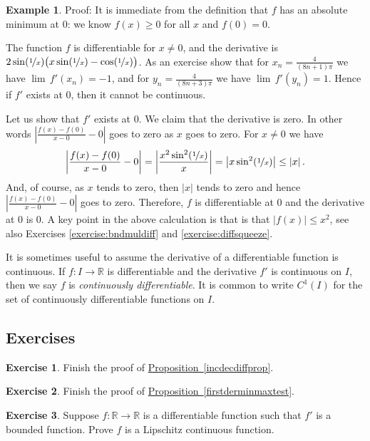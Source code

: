 \documentclass[12pt]{book}
\newcommand{\abs}[1]{\left\lvert {#1} \right\rvert}
\newcommand{\R}{{\mathbb{R}}}
\newcommand{\myindex}[1]{#1\index{#1}}
\theoremstyle{plain}
\theoremstyle{remark}
\theoremstyle{definition}
\theoremstyle{exercise}
\newtheorem{exercise}{Exercise}[section]
\theoremstyle{example}
\newtheorem{example}[thm]{Example}
\newcommand{\propref}[1]{\hyperref[#1]{Proposition~\ref*{#1}}}
\begin{document}
\begin{example}
Proof: It is immediate from the definition that $f$ has an absolute
minimum at 0: we know $f(x) \geq 0$ for all $x$ and $f(0) = 0$.

The function $f$ is differentiable for $x\not=0$,
and
the derivative 
is $2 \sin (\nicefrac{1}{x}) \bigl( x \sin (\nicefrac{1}{x}) -
\cos(\nicefrac{1}{x}) \bigr)$.
As an exercise show that for $x_n = \frac{4}{(8n+1)\pi}$
we have
$\lim\, f'(x_n) = -1$, and for
$y_n = \frac{4}{(8n+3)\pi}$  we have
$\lim\, f'(y_n) = 1$.  Hence if $f'$ exists at $0$,
then it cannot be continuous.

Let us show that $f'$ exists at 0.  We claim that the derivative is zero.
In other words $\abs{\frac{f(x)-f(0)}{x-0} - 0}$ goes to zero
as $x$ goes to zero.  For $x \not= 0$ we have
\begin{equation*}
\abs{\frac{f(x)-f(0)}{x-0} - 0}
=
\abs{\frac{x^2 \sin^2(\nicefrac{1}{x})}{x}}
=
\abs{x \sin^2(\nicefrac{1}{x})}
\leq
\abs{x} .
\end{equation*}
And, of course, as $x$ tends to zero, then $\abs{x}$ tends to zero and hence
$\abs{\frac{f(x)-f(0)}{x-0} - 0}$ goes to zero.  Therefore, $f$
is differentiable at 0 and the derivative at 0 is 0.
A key point in the above calculation is that 
is that $\abs{f(x)} \leq x^2$,
see also Exercises \ref{exercise:bndmuldiff} and
\ref{exercise:diffsqueeze}.
\end{example}

It is sometimes useful to assume the derivative of a differentiable
function is continuous.  If $f \colon I \to \R$ is differentiable and
the derivative $f'$ is continuous on $I$, then we say $f$ is
\emph{\myindex{continuously differentiable}}.  It is common to
write $C^1(I)$ for the set of continuously differentiable functions on $I$.

\subsection{Exercises}

\begin{exercise}
Finish the proof of \propref{incdecdiffprop}.
\end{exercise}

\begin{exercise}
Finish the proof of \propref{firstderminmaxtest}.
\end{exercise}

\begin{exercise} \label{exercise:boundeddermeanslip}
Suppose $f \colon \R \to \R$ is a differentiable
function such that $f'$ is a bounded function.  Prove
$f$ is a Lipschitz continuous function.
\end{exercise}
\end{document}

